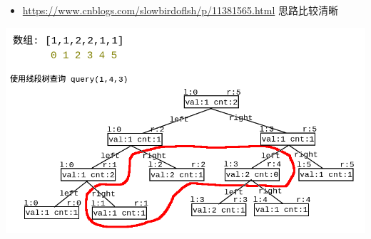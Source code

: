 \documentclass[9pt, b5paaper]{book}
\begin{document}
\begin{itemize}
\item \url{https://www.cnblogs.com/slowbirdoflsh/p/11381565.html} 思路比较清晰
\end{itemize}

\includegraphics[width=.9\linewidth]{./pic/1157.png}
\end{document}
